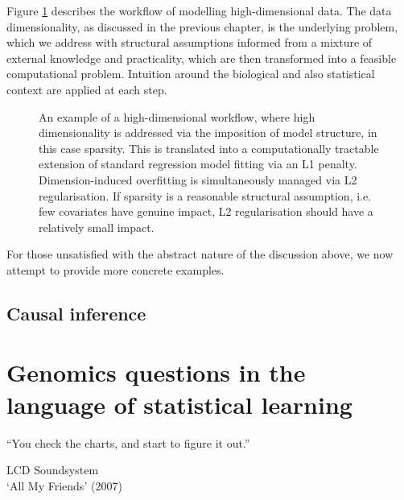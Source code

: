 \documentclass[thesis.tex]{subfiles}
\begin{document}
Figure \ref{fig:workflow} describes the workflow of modelling high-dimensional data. The data dimensionality, as discussed in the previous chapter, is the underlying problem, which we address with structural assumptions informed from a mixture of external knowledge and practicality, which are then transformed into a feasible computational problem. Intuition around the biological and also statistical context are applied at each step.

\begin{figure}[htbp]
\centering
{}
\caption{An example of a high-dimensional workflow, where high dimensionality is addressed via the imposition of model structure, in this case sparsity. This is translated into a computationally tractable extension of standard regression model fitting via an L1 penalty. Dimension-induced overfitting is simultaneously managed via L2 regularisation. If sparsity is a reasonable structural assumption, i.e. few covariates have genuine impact, L2 regularisation should have a relatively small impact.\label{fig:workflow}}
\end{figure}

For those unsatisfied with the abstract nature of the discussion above, we now attempt to provide more concrete examples.

\subsection{Causal inference}

\section{Genomics questions in the language of statistical learning}
\epigraph{``You check the charts, and start to figure it out.''}{LCD Soundsystem \\`All My Friends' (2007)}
\end{document}
